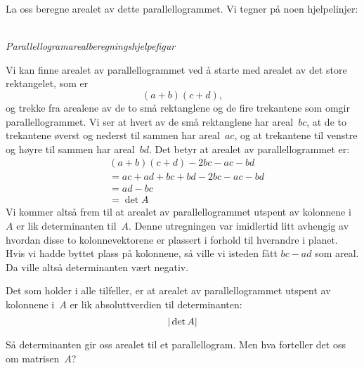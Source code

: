 La oss beregne arealet av dette parallellogrammet.  Vi tegner på noen
hjelpelinjer:
\begin{center}
\\
{\small \textit{Parallellogramarealberegningshjelpefigur}}
\end{center}
Vi kan finne arealet av parallellogrammet ved å starte med arealet av
det store rektangelet, som er
\[
(a + b) (c + d),
\]
og trekke fra arealene av de to små rektanglene og de fire trekantene
som omgir parallellogrammet.  Vi ser at hvert av de små rektanglene
har areal~$bc$, at de to trekantene øverst og nederst til sammen har
areal~$ac$, og at trekantene til venstre og høyre til sammen har
areal~$bd$.  Det betyr at arealet av parallellogrammet er:
\begin{align*}
& \!\!\!\!\!\!\!\!(a + b) (c + d) - 2bc - ac - bd \\
&= ac + ad + bc + bd - 2bc - ac - bd \\
&= ad - bc \\
&= \det A
\end{align*}
Vi kommer altså frem til at arealet av parallellogrammet utspent av
kolonnene i~$A$ er lik determinanten til~$A$.  Denne utregningen var
imidlertid litt avhengig av hvordan disse to kolonnevektorene er
plassert i forhold til hverandre i planet.  Hvis vi hadde byttet plass
på kolonnene, så ville vi isteden fått $bc - ad$ som areal.  Da ville
altså determinanten vært negativ.

Det som holder i alle tilfeller, er at arealet av parallellogrammet
utspent av kolonnene i~$A$ er lik absoluttverdien til determinanten:
\[
|\det A|
\]

\medskip

Så determinanten gir oss arealet til et parallellogram.  Men hva
forteller det oss om matrisen~$A$?

